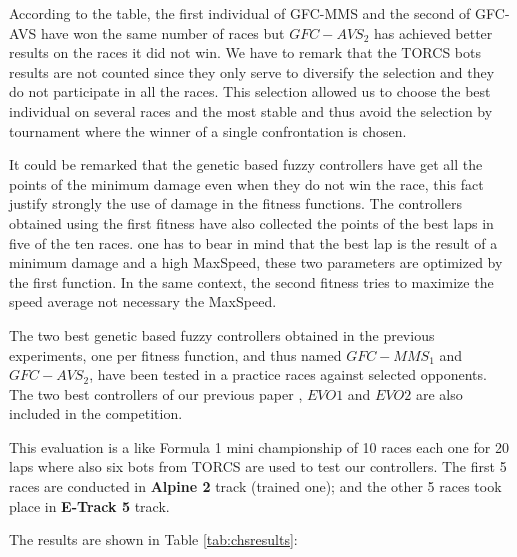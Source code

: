 \documentclass[conference]{IEEEtran}
\begin{document}

According to the table, the first individual of GFC-MMS and the second of GFC-AVS have won the same number of races but $GFC-AVS_2$ has achieved better results on the races it did not win.
We have to remark that the TORCS bots results are not counted since they only serve to diversify the selection and they do not participate in all the races.
This selection allowed us to choose the best individual on several races and the most stable and thus avoid the selection by tournament where the winner of a single confrontation is chosen.

It could be remarked that the genetic based fuzzy controllers have get all the points of the minimum damage even when they do not win the race, this fact  justify strongly the use of damage in the fitness functions.
The controllers obtained using the first fitness have also collected  the points of the best laps in  five of the ten races. one has to bear in mind that the best lap is the result of a minimum damage and a high MaxSpeed, these two parameters are optimized by the first function. In the same context, the second fitness tries to maximize the speed average  not necessary the MaxSpeed.

The two best genetic based fuzzy controllers obtained in the previous
experiments, one per fitness function, and thus named $GFC-MMS_1$ and
$GFC-AVS_2$, have been tested in a practice races against selected opponents. The two best controllers of our previous paper \cite{evo18}, $EVO1$ and $EVO2$ are also included in the competition.

This evaluation is a like Formula 1 mini championship of 10 races each one for 20 laps where also six bots from TORCS are used to test our controllers. The first 5 races are conducted in \textbf{Alpine 2} track (trained one); and the other 5 races took place in \textbf{E-Track 5} track.

The results are shown in Table \ref{tab:chsresults}:
\end{document}

